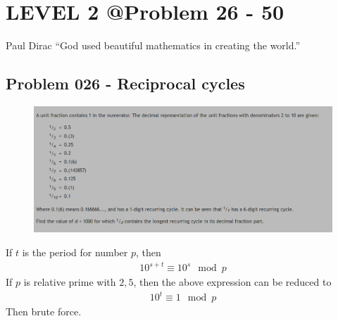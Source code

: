 \chapter{LEVEL 2 @Problem 26 - 50}
\begin{chapquote}{Paul Dirac}
	``God used beautiful mathematics in creating the world.''
\end{chapquote}

\section{Problem 026 - Reciprocal cycles}
\begin{prob}
	\begin{figure}[htb!]
		\begin{center}
			\includegraphics[scale = 0.4]{pic/026.png}
		\end{center}
	\end{figure}
\end{prob}
\begin{sol}
If $t$ is the period for number $p$, then
\begin{eqnarray}
10^{s + t} \equiv 10^s \mod p
\end{eqnarray}
If $p$ is relative prime with $2, 5$, then the above expression can be reduced to
\begin{eqnarray}
10^t \equiv 1 \mod p
\end{eqnarray}
Then brute force.
\end{sol}

